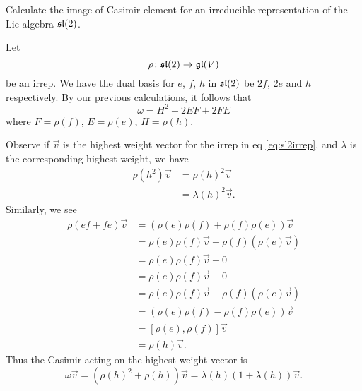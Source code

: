 \begin{exercise}
Calculate the image of Casimir element for an irreducible
representation of the Lie algebra $\frak{sl}(2)$. 
\end{exercise}
\answer

Let
\begin{equation}\label{eq:sl2irrep}
\rho\colon \frak{sl}(2)\to\frak{gl}(V)
\end{equation}
be an irrep.
We have the dual basis for $e$, $f$, $h$ in $\frak{sl}(2)$ be
$2f$, $2e$ and $h$ respectively. By our previous calculations, it
follows that
\begin{equation}
\omega=H^{2}+2EF+2FE
\end{equation}
where $F=\rho(f)$, $E=\rho(e)$, $H=\rho(h)$. 

Observe if $\vec{v}$ is the highest weight vector for the irrep
in eq \eqref{eq:sl2irrep}, and $\lambda$ is the corresponding
highest weight, we have
\begin{subequations}
\begin{align}
\rho(h^{2})\vec{v} &=\rho(h)^{2}\vec{v}\\
&=\lambda(h)^{2}\vec{v}.
\end{align}
\end{subequations}
Similarly, we see
\begin{subequations}
\begin{align}
\rho(ef+fe)\vec{v}&=(\rho(e)\rho(f)+\rho(f)\rho(e))\vec{v}\\
&=\rho(e)\rho(f)\vec{v}+\rho(f)\left(\rho(e)\vec{v}\right)\\
&=\rho(e)\rho(f)\vec{v}+0\\
&=\rho(e)\rho(f)\vec{v}-0\\
&=\rho(e)\rho(f)\vec{v}-\rho(f)\left(\rho(e)\vec{v}\right)\\
&=(\rho(e)\rho(f)-\rho(f)\rho(e))\vec{v}\\
&=[\rho(e),\rho(f)]\vec{v}\\
&=\rho(h)\vec{v}.
\end{align}
\end{subequations}
Thus the Casimir acting on the highest weight vector is
\begin{equation}
\omega\vec{v}=(\rho(h)^{2}+\rho(h))\vec{v}=\lambda(h)\left(1+\lambda(h)\right)\vec{v}.
\end{equation}
